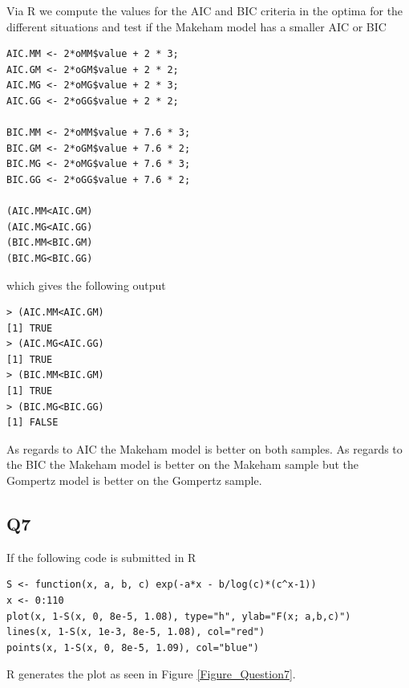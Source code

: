 Via R we compute the values for the AIC and BIC criteria in the optima for the different situations and test if the Makeham model has a smaller AIC or BIC
\begin{verbatim}
AIC.MM <- 2*oMM$value + 2 * 3;
AIC.GM <- 2*oGM$value + 2 * 2;
AIC.MG <- 2*oMG$value + 2 * 3;
AIC.GG <- 2*oGG$value + 2 * 2;

BIC.MM <- 2*oMM$value + 7.6 * 3;
BIC.GM <- 2*oGM$value + 7.6 * 2;
BIC.MG <- 2*oMG$value + 7.6 * 3;
BIC.GG <- 2*oGG$value + 7.6 * 2;

(AIC.MM<AIC.GM)
(AIC.MG<AIC.GG)
(BIC.MM<BIC.GM)
(BIC.MG<BIC.GG)
\end{verbatim}
which gives the following output

\begin{verbatim}
> (AIC.MM<AIC.GM)
[1] TRUE
> (AIC.MG<AIC.GG)
[1] TRUE
> (BIC.MM<BIC.GM)
[1] TRUE
> (BIC.MG<BIC.GG)
[1] FALSE
\end{verbatim}

As regards to AIC the Makeham model is better on both samples. As regards to the BIC the Makeham model is better on the Makeham sample but the Gompertz model is better on the Gompertz sample.

\subsection*{Q7}

If the following code is submitted in R

\begin{verbatim}
S <- function(x, a, b, c) exp(-a*x - b/log(c)*(c^x-1))
x <- 0:110
plot(x, 1-S(x, 0, 8e-5, 1.08), type="h", ylab="F(x; a,b,c)")
lines(x, 1-S(x, 1e-3, 8e-5, 1.08), col="red")
points(x, 1-S(x, 0, 8e-5, 1.09), col="blue")
\end{verbatim}
R generates the plot as seen in Figure \ref{Figure_Question7}.

